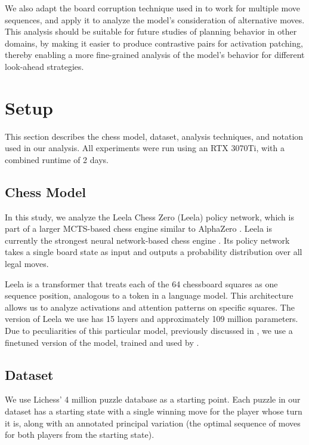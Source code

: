 \documentclass{article}
\begin{document}
We also adapt the board corruption technique used in \citet{jenner2024evidence} to work for multiple move sequences, and apply it to analyze the model's consideration of alternative moves. This analysis should be suitable for future studies of planning behavior in other domains, by making it easier to produce contrastive pairs for activation patching, thereby enabling a more fine-grained analysis of the model's behavior for different look-ahead strategies.

\section{Setup}\label{sec:setup}

This section describes the chess model, dataset, analysis techniques, and notation used in our analysis. All experiments were run using an RTX 3070Ti, with a combined runtime of 2 days.

\subsection{Chess Model}

In this study, we analyze the Leela Chess Zero (Leela) policy network, which is part of a larger MCTS-based chess engine similar to AlphaZero \citep{AlphaZero}. Leela is currently the strongest neural network-based chess engine \citep{haworth2021tcec}. Its policy network takes a single board state as input and outputs a probability distribution over all legal moves.

Leela is a transformer that treats each of the 64 chessboard squares as one sequence position, analogous to a token in a language model. This architecture allows us to analyze activations and attention patterns on specific squares. The version of Leela we use has 15 layers and approximately 109 million parameters. Due to peculiarities of this particular model, previously discussed in \citet{jenner2024evidence}, we use a finetuned version of the model, trained and used by \citet{jenner2024evidence}.

\subsection{Dataset}

We use Lichess' 4 million puzzle database as a starting point. Each puzzle in our dataset has a starting state with a single winning move for the player whose turn it is, along with an annotated principal variation (the optimal sequence of moves for both players from the starting state).
\end{document}
